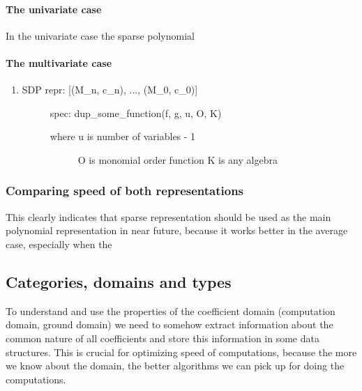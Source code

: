 \paragraph{The univariate case}

In the univariate case the sparse polynomial


\paragraph{The multivariate case}
\begin{enumerate}
\item {} \begin{description}
\item[SDP repr: {[}(M\_n, c\_n), ..., (M\_0, c\_0){]}] \leavevmode
spec: dup\_some\_function(f, g, u, O, K)
\begin{description}
\item[where u is number of variables - 1] \leavevmode
O is monomial order function
K is any algebra

\end{description}

\end{description}

\end{enumerate}


\subsubsection{Comparing speed of both representations}

This clearly indicates that sparse representation should be used as the main polynomial
representation in near future, because it works better in the average case, especially
when the


\subsection{Categories, domains and types}

To understand and use the properties of the coefficient domain (computation domain, ground domain)
we need to somehow extract information about the common nature of all coefficients and store this
information in some data structures. This is crucial for optimizing speed of computations, because
the more we know about the domain, the better algorithms we can pick up for doing the computations.

\cite{Bronstein2004algebra}
\cite{Aldor2000guide}

